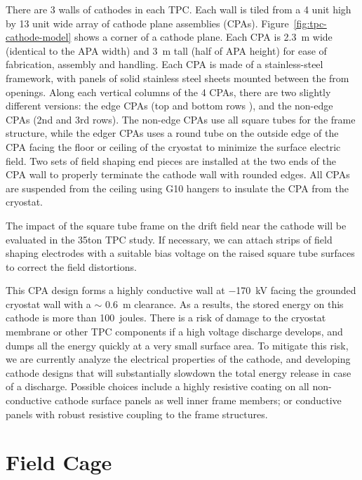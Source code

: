 There are 3 walls of cathodes in each TPC.  Each wall is tiled from a 4 unit high by 13 unit wide array of cathode plane assemblies (CPAs). Figure~\ref{fig:tpc-cathode-model} shows a corner of a cathode plane.  Each CPA is 2.3~m wide (identical to the APA width) and 3~m tall (half of APA height) for ease of fabrication, assembly and handling.  Each CPA is made of a stainless-steel framework, 
with panels of solid stainless steel sheets mounted between the from openings.  Along each vertical  columns of the 4 CPAs, there are two slightly different versions: the edge CPAs (top and bottom rows ), and the non-edge CPAs (2nd and 3rd rows).  The non-edge CPAs use all square tubes for the frame structure, while the edger CPAs uses a round tube on the outside edge of the CPA facing the floor or ceiling of the cryostat to minimize the surface electric field.  Two sets of field shaping end pieces are installed at the two ends of the CPA wall to properly terminate the cathode wall with rounded edges.  All CPAs are suspended from the ceiling using G10 hangers to insulate the CPA from the cryostat.


The impact of the square tube frame on the drift field near the cathode will be evaluated in the 35ton TPC study.  If necessary, we can attach strips of field shaping electrodes with a suitable bias voltage on the raised square tube surfaces to correct the field distortions.  


This CPA design forms a highly conductive wall at $-$170~kV facing the grounded cryostat wall with a $\sim$ 0.6~m clearance.  As a results, the stored energy on this cathode is more than 100~joules.  There is a risk of damage to the cryostat membrane or other TPC components if a high voltage discharge develops, and dumps all the energy quickly at a very small surface area. To mitigate this risk, we are currently analyze the electrical properties of the cathode, and developing cathode designs that will substantially slowdown the total energy release in case of a discharge.  Possible choices include a highly resistive coating on all non-conductive cathode surface panels as well inner frame members; or conductive panels with robust resistive coupling to the frame structures.




\section{Field Cage}
\label{subsec:v5-tpc-chamber-fieldcage}

